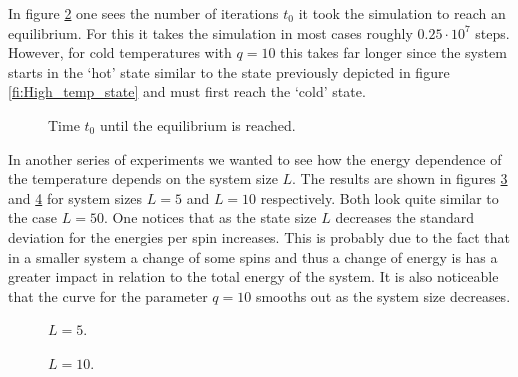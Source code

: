 \begin{figure}
\centering
\begin{minipage}{0.7\textwidth}
\centering
\graphicspath{{../../Plots/}}

\caption{}
\label{fi:energies_T_q_L50}
\end{minipage}
\end{figure}

In figure \ref{fi:t0_T_q_L50} one sees the number of iterations $t_0$ it took the simulation to reach an equilibrium.
For this it takes the simulation in most cases roughly $0.25\cdot 10^7$ steps. However, for cold temperatures with $q=10$ this takes far longer since the system starts in the `hot' state similar to the state previously depicted in figure \ref{fi:High_temp_state} and must first reach the `cold' state.

\begin{figure}
\centering
\begin{minipage}{0.7\textwidth}
\centering
\graphicspath{{../../Plots/}}

\caption{Time $t_0$ until the equilibrium is reached.}
\label{fi:t0_T_q_L50}
\end{minipage}
\end{figure}

In another series of experiments we wanted to see how the energy dependence of the temperature depends on the system size $L$. The results are shown in figures \ref{fi:energies_T_q_L5} and \ref{fi:energies_T_q_L10} for system sizes $L=5$ and $L=10$ respectively. Both look quite similar to the case $L=50$. One notices that as the state size $L$ decreases the standard deviation for the energies per spin increases. This is probably due to the fact that in a smaller system a change of some spins and thus a change of energy is has a greater impact in relation to the total energy of the system.
It is also noticeable that the curve for the parameter $q=10$ smooths out as the system size decreases.

\begin{figure}
\centering
\begin{minipage}{0.7\textwidth}
\centering
\graphicspath{{../../Plots/}}

\caption{$L=5$.}
\label{fi:energies_T_q_L5}
\end{minipage}
\end{figure}

\begin{figure}
\centering
\begin{minipage}{0.7\textwidth}
\centering
\graphicspath{{../../Plots/}}

\caption{$L=10$.}
\label{fi:energies_T_q_L10}
\end{minipage}
\end{figure}


